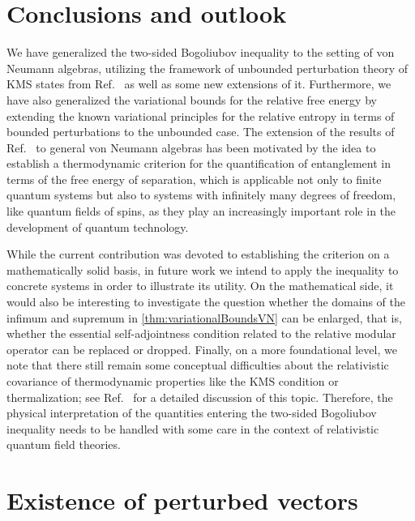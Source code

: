 \documentclass[a4paper, twoside, 11pt, reqno]{amsart}
\theoremstyle{definition}
\theoremstyle{plain}
\newcommand{\1}{\mathbf{1}}
\begin{document}
\section{Conclusions and outlook}

We have generalized the two-sided Bogoliubov inequality \cite{Reible2022} to the setting of von Neumann algebras, utilizing the framework of unbounded perturbation theory of KMS states from Ref.~\cite{DJP03} as well as some new extensions of it. Furthermore, we have also generalized the variational bounds for the relative free energy \cite{Reible2022} by extending the known variational principles for the relative entropy in terms of bounded perturbations \cite{Petz1988} to the unbounded case. The extension of the results of Ref.~\cite{Reible2022} to general von Neumann algebras has been motivated by the idea to establish a thermodynamic criterion for the quantification of entanglement in terms of the free energy of separation, which is applicable not only to finite quantum systems but also to systems with infinitely many degrees of freedom, like quantum fields of spins, as they play an increasingly important role in the development of quantum technology.

While the current contribution was devoted to establishing the criterion on a mathematically solid basis, in future work we intend to apply the inequality to concrete systems in order to illustrate its utility. On the mathematical side, it would also be interesting to investigate the question whether the domains of the infimum and supremum in \cref{thm:variationalBoundsVN} can be enlarged, that is, whether the essential self-adjointness condition related to the relative modular operator can be replaced or dropped. Finally, on a more foundational level, we note that there still remain some conceptual difficulties about the relativistic covariance of thermodynamic properties like the KMS condition or thermalization; see Ref.~\cite{Passegger2025} for a detailed discussion of this topic. Therefore, the physical interpretation of the quantities entering the two-sided Bogoliubov inequality needs to be handled with some care in the context of relativistic quantum field theories.



\appendix
\section{Existence of perturbed vectors}\label{app:perturbedVectors}
\end{document}
